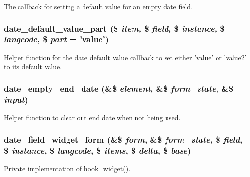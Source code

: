 \label{date__elements_8inc_aa01d96bc4c74fb8c7f8c2fc36d05d199}
The callback for setting a default value for an empty date field. \hypertarget{date__elements_8inc_aa64b1801dba4cfa8c0ca02099fa7147a}{
\subsubsection[{date\_\-default\_\-value\_\-part}]{\setlength{\rightskip}{0pt plus 5cm}date\_\-default\_\-value\_\-part (\$ {\em item}, \/  \$ {\em field}, \/  \$ {\em instance}, \/  \$ {\em langcode}, \/  \$ {\em part} = {\ttfamily 'value'})}}
\label{date__elements_8inc_aa64b1801dba4cfa8c0ca02099fa7147a}
Helper function for the date default value callback to set either 'value' or 'value2' to its default value. \hypertarget{date__elements_8inc_a9de4ee190a27560be3dddbb7f951cf24}{
\subsubsection[{date\_\-empty\_\-end\_\-date}]{\setlength{\rightskip}{0pt plus 5cm}date\_\-empty\_\-end\_\-date (\&\$ {\em element}, \/  \&\$ {\em form\_\-state}, \/  \&\$ {\em input})}}
\label{date__elements_8inc_a9de4ee190a27560be3dddbb7f951cf24}
Helper function to clear out end date when not being used. \hypertarget{date__elements_8inc_abed5ce13fbc96267910eba507d2c6989}{
\subsubsection[{date\_\-field\_\-widget\_\-form}]{\setlength{\rightskip}{0pt plus 5cm}date\_\-field\_\-widget\_\-form (\&\$ {\em form}, \/  \&\$ {\em form\_\-state}, \/  \$ {\em field}, \/  \$ {\em instance}, \/  \$ {\em langcode}, \/  \$ {\em items}, \/  \$ {\em delta}, \/  \$ {\em base})}}
\label{date__elements_8inc_abed5ce13fbc96267910eba507d2c6989}
Private implementation of hook\_\-widget().

